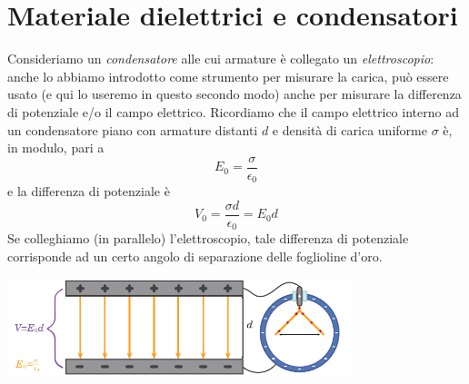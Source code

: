 \section{Materiale dielettrici e condensatori}
Consideriamo un \textit{condensatore} alle cui armature è collegato un \textit{elettroscopio}: anche lo abbiamo introdotto come strumento per misurare la carica, può essere usato (e qui lo useremo in questo secondo modo) anche per misurare la differenza di potenziale e/o il campo elettrico. Ricordiamo che il campo elettrico interno ad un condensatore piano con armature distanti $d$ e densità di carica uniforme $\sigma$ è, in modulo, pari a
\begin{equation*}
	E_0=\frac{\sigma}{\epsilon_0}
\end{equation*}
e la differenza di potenziale è
\begin{equation*}
	V_0=\frac{\sigma d}{\epsilon_0}=E_0d
\end{equation*}
Se colleghiamo (in parallelo) l'elettroscopio, tale differenza di potenziale corrisponde ad un certo angolo di separazione delle foglioline d'oro. 
\begin{center}
	\includegraphics[width=0.75\textwidth]{images/chp6/chp6elettroscopio1.pdf}
\end{center}
